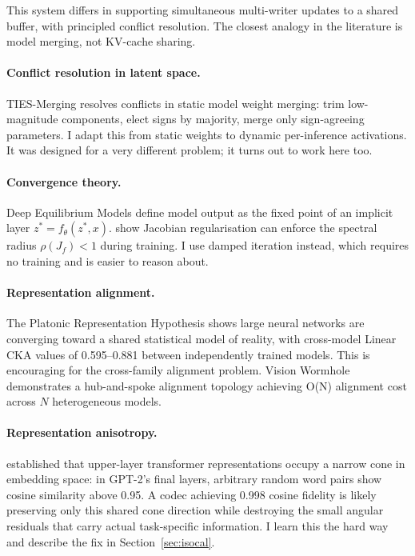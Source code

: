 \documentclass[10pt,twocolumn]{article}
\begin{document}
This system differs in supporting simultaneous multi-writer updates to a shared buffer, with principled conflict resolution. The closest analogy in the literature is model merging, not KV-cache sharing.

\paragraph{Conflict resolution in latent space.}
TIES-Merging \citep{tiesmerging2023} resolves conflicts in static model weight merging: trim low-magnitude components, elect signs by majority, merge only sign-agreeing parameters. I adapt this from static weights to dynamic per-inference activations. It was designed for a very different problem; it turns out to work here too.

\paragraph{Convergence theory.}
Deep Equilibrium Models \citep{bai2019deq} define model output as the fixed point of an implicit layer $z^* = f_\theta(z^*, x)$. \citet{bai2021jacobian} show Jacobian regularisation can enforce the spectral radius $\rho(J_f) < 1$ during training. I use damped iteration instead, which requires no training and is easier to reason about.

\paragraph{Representation alignment.}
The Platonic Representation Hypothesis \citep{huh2024platonic} shows large neural networks are converging toward a shared statistical model of reality, with cross-model Linear CKA values of 0.595--0.881 between independently trained models. This is encouraging for the cross-family alignment problem. Vision Wormhole \citep{visionwormhole2026} demonstrates a hub-and-spoke alignment topology achieving O(N) alignment cost across $N$ heterogeneous models.

\paragraph{Representation anisotropy.}
\citet{ethayarajh2019contextual} established that upper-layer transformer representations occupy a narrow cone in embedding space: in GPT-2's final layers, arbitrary random word pairs show cosine similarity above 0.95. A codec achieving 0.998 cosine fidelity is likely preserving only this shared cone direction while destroying the small angular residuals that carry actual task-specific information. I learn this the hard way and describe the fix in Section~\ref{sec:isocal}.
\end{document}
